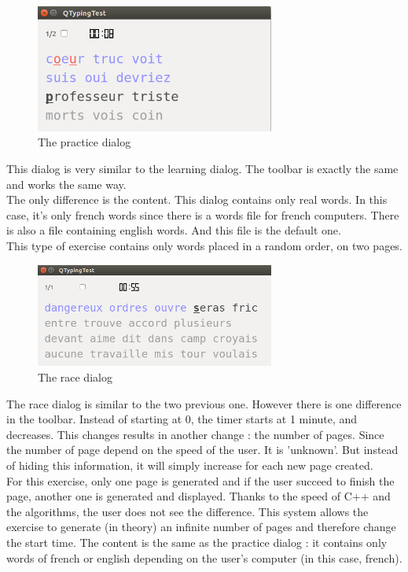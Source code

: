 \begin{figure}[H]
	\centering
	\includegraphics[width=0.7\textwidth]{images/dialog-practice.png}
	 \caption{The practice dialog}
	 \label{dialog-practice}
\end{figure}

This dialog is very similar to the learning dialog. The toolbar is exactly the same and works the same way.\\
The only difference is the content. This dialog contains only real words. In this case, it's only french words since there is a words file for french computers. There is also a file containing english words. And this file is the default one.\\
This type of exercise contains only words placed in a random order, on two pages.

\begin{figure}[H]
	\centering
	\includegraphics[width=0.7\textwidth]{images/dialog-race.png}
	 \caption{The race dialog}
	 \label{dialog-race}
\end{figure}

The race dialog is similar to the two previous one. However there is one difference in the toolbar. Instead of starting at 0, the timer starts at 1 minute, and decreases. This changes results in another change : the number of pages. Since the number of page depend on the speed of the user. It is 'unknown'. But instead of hiding this information, it will simply increase for each new page created.\\
For this exercise, only one page is generated and if the user succeed to finish the page, another one is generated and displayed. Thanks to the speed of C++ and the algorithms, the user does not see the difference. This system allows the exercise to generate (in theory) an infinite number of pages and therefore change the start time.
The content is the same as the practice dialog : it contains only words of french or english depending on the user's computer (in this case, french).\\


